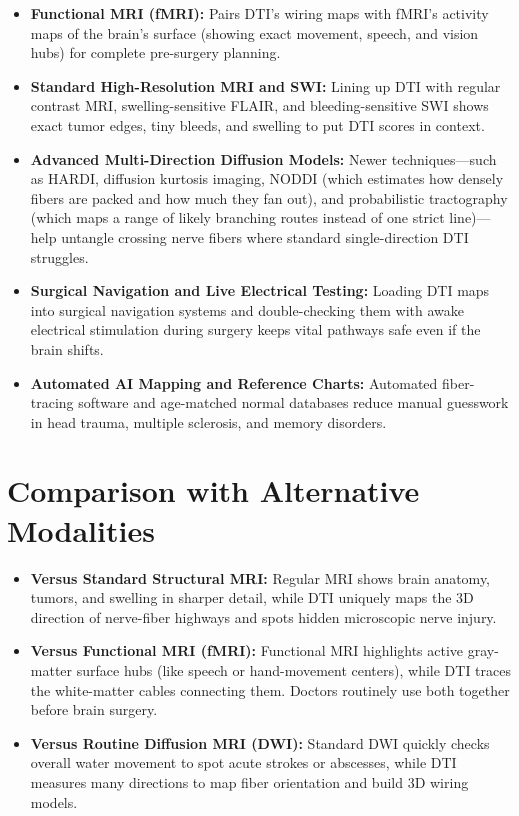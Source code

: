 \begin{itemize}
    \item \textbf{Functional MRI (fMRI):} Pairs DTI's wiring maps with fMRI's activity maps of the brain's surface (showing exact movement, speech, and vision hubs) for complete pre-surgery planning.
    \item \textbf{Standard High-Resolution MRI and SWI:} Lining up DTI with regular contrast MRI, swelling-sensitive FLAIR, and bleeding-sensitive SWI shows exact tumor edges, tiny bleeds, and swelling to put DTI scores in context.
    \item \textbf{Advanced Multi-Direction Diffusion Models:} Newer techniques---such as HARDI, diffusion kurtosis imaging, NODDI (which estimates how densely fibers are packed and how much they fan out), and probabilistic tractography (which maps a range of likely branching routes instead of one strict line)---help untangle crossing nerve fibers where standard single-direction DTI struggles.
    \item \textbf{Surgical Navigation and Live Electrical Testing:} Loading DTI maps into surgical navigation systems and double-checking them with awake electrical stimulation during surgery keeps vital pathways safe even if the brain shifts.
    \item \textbf{Automated AI Mapping and Reference Charts:} Automated fiber-tracing software and age-matched normal databases reduce manual guesswork in head trauma, multiple sclerosis, and memory disorders.
\end{itemize}

\section{Comparison with Alternative Modalities}

\begin{itemize}
    \item \textbf{Versus Standard Structural MRI:} Regular MRI shows brain anatomy, tumors, and swelling in sharper detail, while DTI uniquely maps the 3D direction of nerve-fiber highways and spots hidden microscopic nerve injury.
    \item \textbf{Versus Functional MRI (fMRI):} Functional MRI highlights active gray-matter surface hubs (like speech or hand-movement centers), while DTI traces the white-matter cables connecting them. Doctors routinely use both together before brain surgery.
    \item \textbf{Versus Routine Diffusion MRI (DWI):} Standard DWI quickly checks overall water movement to spot acute strokes or abscesses, while DTI measures many directions to map fiber orientation and build 3D wiring models.
\end{itemize}

